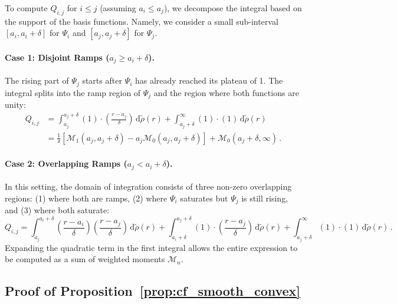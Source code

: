 \documentclass[twoside]{article}
\newcommand{\1}{\mathds{1}}
\newcommand*{\rd}{\mathrm{d}}
\newcommand*{\dd}{\, \rd}
\theoremstyle{plain}
\theoremstyle{definition}
\theoremstyle{remark}
\renewcommand{\tilde}{\widetilde}
\begin{document}
To compute $Q_{i,j}$ for $i \le j$ (assuming $a_i \le a_j$), we decompose the integral based on the support of the basis functions. Namely, we consider a small sub-interval $\left[a_i, a_i+\delta\right]$ for $\Psi_i$ and $\left[a_j, a_j+\delta\right]$ for $\Psi_j$.
\paragraph{Case 1: Disjoint Ramps ($a_j \ge a_i + \delta$).}
The rising part of $\Psi_j$ starts after $\Psi_i$ has already reached its plateau of 1. The integral splits into the ramp region of $\Psi_j$ and the region where both functions are unity:
\begin{align*}
    Q_{i,j} &= \int_{a_j}^{a_j+\delta} (1) \cdot \left(\frac{r-a_j}{\delta}\right) \dd \tilde{\rho}(r) + \int_{a_j+\delta}^{\infty} (1) \cdot (1) \dd \tilde{\rho}(r) \\
    &= \frac{1}{\delta}\left[\mathcal{M}_1(a_j, a_j+\delta) - a_j \mathcal{M}_0(a_j, a_j+\delta)\right] + \mathcal{M}_0(a_j+\delta, \infty)\,.
\end{align*}

\paragraph{Case 2: Overlapping Ramps ($a_j < a_i + \delta$).}
    In this setting, the domain of integration consists of three non-zero overlapping regions: (1) where both are ramps, (2) where $\Psi_i$ saturates but $\Psi_j$ is still rising, and (3) where both saturate:
\begin{equation*}
    Q_{i,j} = \int_{a_j}^{a_i+\delta} \left(\frac{r-a_i}{\delta}\right)\left(\frac{r-a_j}{\delta}\right) \dd \tilde{\rho}(r)+ \int_{a_i+\delta}^{a_j+\delta} (1) \cdot \left(\frac{r-a_j}{\delta}\right) \dd \tilde{\rho}(r) + \int_{a_j+\delta}^{\infty} (1) \cdot (1) \dd \tilde{\rho}(r)\,.
\end{equation*}
Expanding the quadratic term in the first integral allows the entire expression to be computed as a sum of weighted moments $\mathcal{M}_n$. 

\subsection{Proof of Proposition~\ref{prop:cf_smooth_convex}}\label{app:proof_smooth_cvx}
\end{document}
